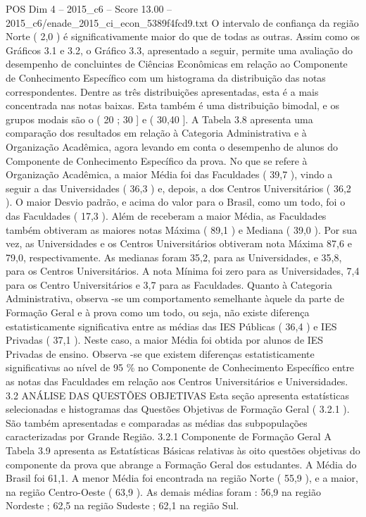 \begin{textsample}{POS Dim 4 – 2015\_c6 – Score 13.00 – 2015\_c6/enade\_2015\_ci\_econ\_5389f4fcd9.txt}
O intervalo de confiança da região Norte ( 2,0 ) é significativamente maior do que de todas as outras.
Assim como os Gráficos 3.1 e 3.2, o Gráfico 3.3, apresentado a seguir, permite uma avaliação do desempenho de concluintes de Ciências Econômicas em relação ao Componente de Conhecimento Específico com um histograma da distribuição das notas correspondentes.
Dentre as três distribuições apresentadas, esta é a mais concentrada nas notas baixas.
Esta também é uma distribuição bimodal, e os grupos modais são o ( 20 ; 30 ] e ( 30,40 ].
A Tabela 3.8 apresenta uma comparação dos resultados em relação à Categoria Administrativa e à Organização Acadêmica, agora levando em conta o desempenho de alunos do Componente de Conhecimento Específico da prova.
No que se refere à Organização Acadêmica, a maior Média foi das Faculdades ( 39,7 ), vindo a seguir a das Universidades ( 36,3 ) e, depois, a dos Centros Universitários ( 36,2 ).
O maior Desvio padrão, e acima do valor para o Brasil, como um todo, foi o das Faculdades ( 17,3 ).
Além de receberam a maior Média, as Faculdades também obtiveram as maiores notas Máxima ( 89,1 ) e Mediana ( 39,0 ).
Por sua vez, as Universidades e os Centros Universitários obtiveram nota Máxima 87,6 e 79,0, respectivamente.
As medianas foram 35,2, para as Universidades, e 35,8, para os Centros Universitários.
A nota Mínima foi zero para as Universidades, 7,4 para os Centro Universitários e 3,7 para as Faculdades.
Quanto à Categoria Administrativa, observa -se um comportamento semelhante àquele da parte de Formação Geral e à prova como um todo, ou seja, não existe diferença estatisticamente significativa entre as médias das IES Públicas ( 36,4 ) e IES Privadas ( 37,1 ).
Neste caso, a maior Média foi obtida por alunos de IES Privadas de ensino.
Observa -se que existem diferenças estatisticamente significativas ao nível de 95 \% no Componente de Conhecimento Específico entre as notas das Faculdades em relação aos Centros Universitários e Universidades. 3.2 ANÁLISE DAS QUESTÕES OBJETIVAS Esta seção apresenta estatísticas selecionadas e histogramas das Questões Objetivas de Formação Geral ( 3.2.1 ).
São também apresentadas e comparadas as médias das subpopulações caracterizadas por Grande Região. 3.2.1 Componente de Formação Geral A Tabela 3.9 apresenta as Estatísticas Básicas relativas às oito questões objetivas do componente da prova que abrange a Formação Geral dos estudantes.
A Média do Brasil foi 61,1.
A menor Média foi encontrada na região Norte ( 55,9 ), e a maior, na região Centro-Oeste ( 63,9 ).
As demais médias foram : 56,9 na região Nordeste ; 62,5 na região Sudeste ; 62,1 na região Sul.

\end{textsample}
